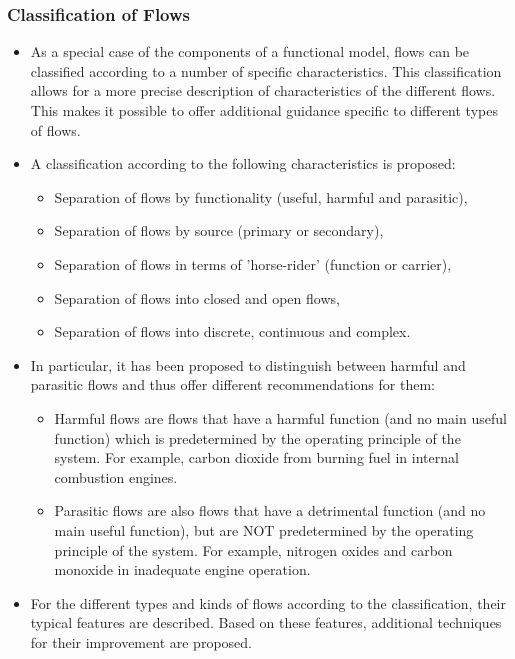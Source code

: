\documentclass[a4paper,11pt]{article}
\begin{document}
\subsubsection{Classification of Flows}
\begin{itemize}
\item As a special case of the components of a functional model, flows can be
  classified according to a number of specific characteristics. This
  classification allows for a more precise description of characteristics of
  the different flows. This makes it possible to offer additional guidance
  specific to different types of flows.
\item A classification according to the following characteristics is proposed:
  \begin{itemize}
  \item Separation of flows by functionality (useful, harmful and parasitic),
  \item Separation of flows by source (primary or secondary),
  \item Separation of flows in terms of 'horse-rider' (function or carrier),
  \item Separation of flows into closed and open flows,
  \item Separation of flows into discrete, continuous and complex.
  \end{itemize}
\item In particular, it has been proposed to distinguish between harmful and
  parasitic flows and thus offer different recommendations for them:
  \begin{itemize}
  \item Harmful flows are flows that have a harmful function (and no main
    useful function) which is predetermined by the operating principle of the
    system. For example, carbon dioxide from burning fuel in internal
    combustion engines.
  \item Parasitic flows are also flows that have a detrimental function (and
    no main useful function), but are NOT predetermined by the operating
    principle of the system. For example, nitrogen oxides and carbon monoxide
    in inadequate engine operation.
  \end{itemize}
\item For the different types and kinds of flows according to the
  classification, their typical features are described. Based on these
  features, additional techniques for their improvement are proposed.
\end{itemize}
\end{document}
